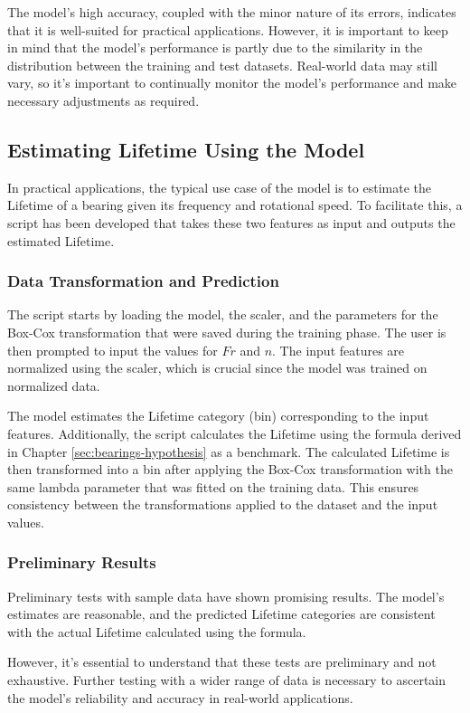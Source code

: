 The model's high accuracy, coupled with the minor nature of its errors, indicates that it is well-suited for practical applications. However, it is important to keep in mind that the model's performance is partly due to the similarity in the distribution between the training and test datasets. Real-world data may still vary, so it's important to continually monitor the model's performance and make necessary adjustments as required.


\subsection{Estimating Lifetime Using the Model}
In practical applications, the typical use case of the model is to estimate the Lifetime of a bearing given its frequency and rotational speed. To facilitate this, a script has been developed that takes these two features as input and outputs the estimated Lifetime.

\subsubsection{Data Transformation and Prediction}
The script starts by loading the model, the scaler, and the parameters for the Box-Cox transformation that were saved during the training phase. The user is then prompted to input the values for \(Fr\) and \(n\). The input features are normalized using the scaler, which is crucial since the model was trained on normalized data.

The model estimates the Lifetime category (bin) corresponding to the input features. Additionally, the script calculates the Lifetime using the formula derived in Chapter \ref{sec:bearings-hypothesis} as a benchmark. The calculated Lifetime is then transformed into a bin after applying the Box-Cox transformation with the same lambda parameter that was fitted on the training data. This ensures consistency between the transformations applied to the dataset and the input values.

\subsubsection{Preliminary Results}
Preliminary tests with sample data have shown promising results. The model's estimates are reasonable, and the predicted Lifetime categories are consistent with the actual Lifetime calculated using the formula.

However, it's essential to understand that these tests are preliminary and not exhaustive. Further testing with a wider range of data is necessary to ascertain the model's reliability and accuracy in real-world applications.

